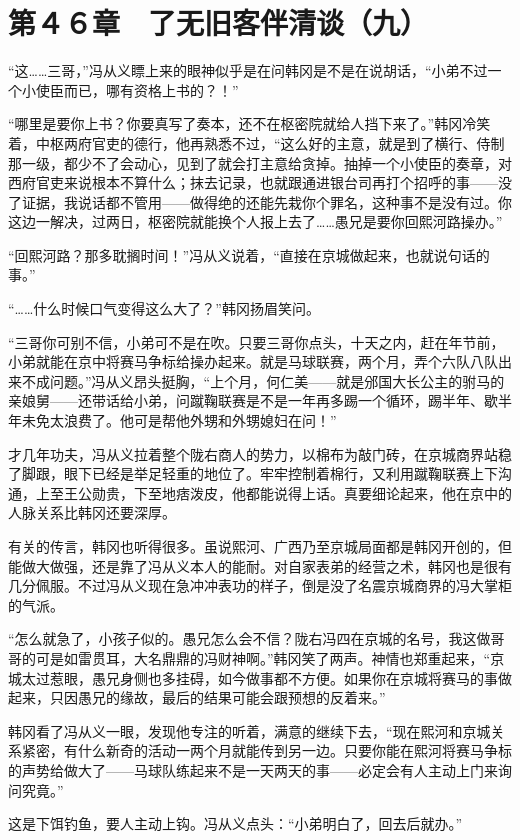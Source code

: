 \section{第４６章　了无旧客伴清谈（九）}

“这……三哥，”冯从义瞟上来的眼神似乎是在问韩冈是不是在说胡话，“小弟不过一个小使臣而已，哪有资格上书的？！”

“哪里是要你上书？你要真写了奏本，还不在枢密院就给人挡下来了。”韩冈冷笑着，中枢两府官吏的德行，他再熟悉不过，“这么好的主意，就是到了横行、侍制那一级，都少不了会动心，见到了就会打主意给贪掉。抽掉一个小使臣的奏章，对西府官吏来说根本不算什么；抹去记录，也就跟通进银台司再打个招呼的事——没了证据，我说话都不管用——做得绝的还能先栽你个罪名，这种事不是没有过。你这边一解决，过两日，枢密院就能换个人报上去了……愚兄是要你回熙河路操办。”

“回熙河路？那多耽搁时间！”冯从义说着，“直接在京城做起来，也就说句话的事。”

“……什么时候口气变得这么大了？”韩冈扬眉笑问。

“三哥你可别不信，小弟可不是在吹。只要三哥你点头，十天之内，赶在年节前，小弟就能在京中将赛马争标给操办起来。就是马球联赛，两个月，弄个六队八队出来不成问题。”冯从义昂头挺胸，“上个月，何仁美——就是邠国大长公主的驸马的亲娘舅——还带话给小弟，问蹴鞠联赛是不是一年再多踢一个循环，踢半年、歇半年未免太浪费了。他可是帮他外甥和外甥媳妇在问！”

才几年功夫，冯从义拉着整个陇右商人的势力，以棉布为敲门砖，在京城商界站稳了脚跟，眼下已经是举足轻重的地位了。牢牢控制着棉行，又利用蹴鞠联赛上下沟通，上至王公勋贵，下至地痞泼皮，他都能说得上话。真要细论起来，他在京中的人脉关系比韩冈还要深厚。

有关的传言，韩冈也听得很多。虽说熙河、广西乃至京城局面都是韩冈开创的，但能做大做强，还是靠了冯从义本人的能耐。对自家表弟的经营之术，韩冈也是很有几分佩服。不过冯从义现在急冲冲表功的样子，倒是没了名震京城商界的冯大掌柜的气派。

“怎么就急了，小孩子似的。愚兄怎么会不信？陇右冯四在京城的名号，我这做哥哥的可是如雷贯耳，大名鼎鼎的冯财神啊。”韩冈笑了两声。神情也郑重起来，“京城太过惹眼，愚兄身侧也多挂碍，如今做事都不方便。如果你在京城将赛马的事做起来，只因愚兄的缘故，最后的结果可能会跟预想的反着来。”

韩冈看了冯从义一眼，发现他专注的听着，满意的继续下去，“现在熙河和京城关系紧密，有什么新奇的活动一两个月就能传到另一边。只要你能在熙河将赛马争标的声势给做大了——马球队练起来不是一天两天的事——必定会有人主动上门来询问究竟。”

这是下饵钓鱼，要人主动上钩。冯从义点头：“小弟明白了，回去后就办。”

